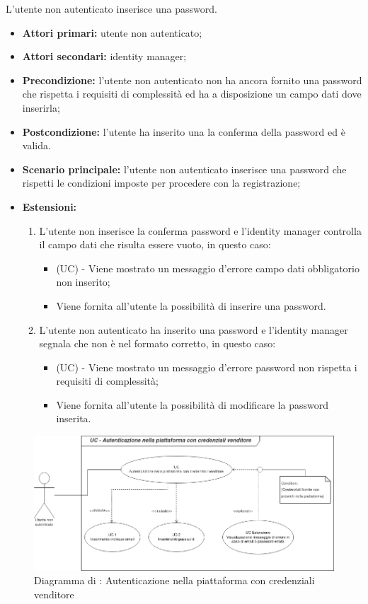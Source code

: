 L'utente non autenticato inserisce una password.
\begin{itemize}
	\item \textbf{Attori primari:} utente non autenticato;
	\item \textbf{Attori secondari:} identity manager;
	\item \textbf{Precondizione:} l'utente non autenticato non ha ancora fornito una password che rispetta i requisiti di complessità ed ha a disposizione un campo dati dove inserirla;
	\item \textbf{Postcondizione:} l'utente ha inserito una la conferma della password ed è valida.
	\item \textbf{Scenario principale:} l'utente non autenticato inserisce una password che rispetti le condizioni imposte per procedere con la registrazione;
	\item \textbf{Estensioni:} 
	\begin{enumerate}
		\item L'utente non inserisce la conferma password e l'identity manager controlla il campo dati che risulta essere vuoto, in questo caso:
		\begin{itemize}
			\item (UC) - Viene mostrato un messaggio d'errore campo dati obbligatorio non inserito;
			\item Viene fornita all'utente la possibilità di inserire una password.
		\end{itemize}
		\item L'utente non autenticato ha inserito una password e l'identity manager segnala che non è nel formato corretto, in questo caso:
		\begin{itemize}
			\item (UC) - Viene mostrato un messaggio d'errore password non rispetta i requisiti di complessità;
			\item Viene fornita all'utente la possibilità di modificare la password inserita.
		\end{itemize}
	\end{enumerate} 
\end{itemize}

\begin{figure}[H]
    \centering
    \includegraphics[scale=0.6]{Immagini/DiagrammiUC/AccessoVenditore.png}
    \caption{Diagramma di \actualUC: Autenticazione nella piattaforma con credenziali venditore} 
    \label{fig:LoginVenditore}
\end{figure}

